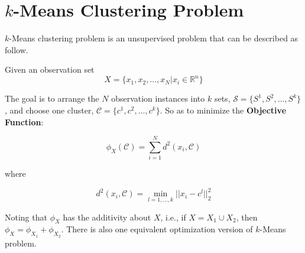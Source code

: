  \section{$k$-Means Clustering Problem}
	$k$-Means clustering problem is an unsupervised problem that can be described as follow.

\begin{definition}
    \label{alo: def1}
 Given an observation set 
        \begin{equation}
        X=\{x_{1}, x_{2}, \dots, x_{N} | x_{i} \in\mathbb{R}^n\}
        \end{equation}

	The goal is to arrange the $N$ observation instances into $k$ sets, $\mathcal{S} = \{S^{1}, S^{2}, \dots, S^{k}\}$, and choose one cluster, $\mathcal{C} = \{c^{1}, c^{2}, \dots, c^{k}\}$. So as to minimize the \textbf{Objective Function}:
	
        \begin{equation}
        \phi_{X}(\mathcal{C}) = \sum_{i = 1}^{N} d^{2}(x_{i}, \mathcal{C})
        \end{equation}	
        
        where 
 
         \begin{equation}
        d^{2}(x_{i}, \mathcal{C}) = \min_{l = 1, \dots, k} ||x_{i} - c^{l}||_{2}^{2}
        \end{equation}	       
        
        Noting that $\phi_{X}$ has the additivity about $X$, i.e., if $X = X_{1}\cup X_{2}$, then $\phi_{X} = \phi_{X_{1}} + \phi_{X_{2}}$.  There is also one equivalent optimization version of $k$-Means problem.
\end{definition}
